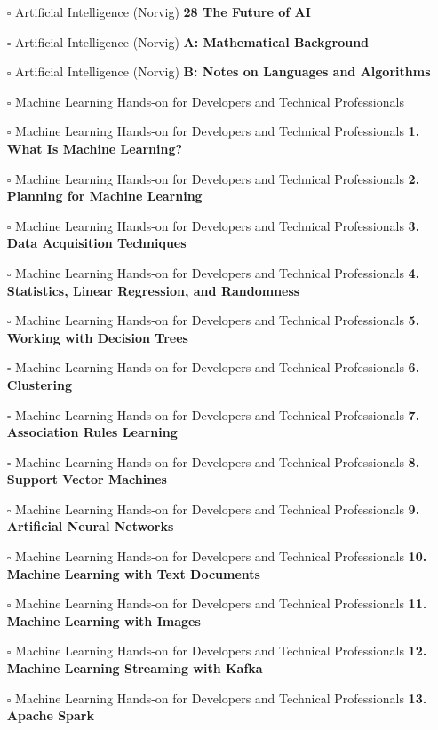 \documentclass[a4, landscape, 12pt]{article}
\newcommand{\checkbox}{$\square$}%
\begin{document}
\begin{itemize}
{}
\item [\checkbox]  Artificial Intelligence (Norvig) \textbf{ 28 The Future of AI
}
\item [\checkbox]  Artificial Intelligence (Norvig) \textbf{ A: Mathematical Background
}
\item [\checkbox]  Artificial Intelligence (Norvig) \textbf{ B: Notes on Languages and Algorithms
}
\item [\checkbox]  Machine Learning Hands-on for Developers and Technical Professionals \textbf{
}
\item [\checkbox]  Machine Learning Hands-on for Developers and Technical Professionals \textbf{ 1. What Is 
Machine Learning?
}
\item [\checkbox]  Machine Learning Hands-on for Developers and Technical Professionals \textbf{ 2. Planning for Machine Learning
}
\item [\checkbox]  Machine Learning Hands-on for Developers and Technical Professionals \textbf{ 3. Data Acquisition Techniques
}
\item [\checkbox]  Machine Learning Hands-on for Developers and Technical Professionals \textbf{ 4. Statistics, Linear Regression, and Randomness
}
\item [\checkbox]  Machine Learning Hands-on for Developers and Technical Professionals \textbf{ 5. Working with Decision Trees
}
\item [\checkbox]  Machine Learning Hands-on for Developers and Technical Professionals \textbf{ 6. Clustering
}
\item [\checkbox]  Machine Learning Hands-on for Developers and Technical Professionals \textbf{ 7. Association Rules Learning
}
\item [\checkbox]  Machine Learning Hands-on for Developers and Technical Professionals \textbf{ 8. Support Vector Machines
}
\item [\checkbox]  Machine Learning Hands-on for Developers and Technical Professionals \textbf{ 9. Artificial Neural Networks
}
\item [\checkbox]  Machine Learning Hands-on for Developers and Technical Professionals \textbf{ 10. Machine Learning with Text Documents
}
\item [\checkbox]  Machine Learning Hands-on for Developers and Technical Professionals \textbf{ 11. Machine Learning with Images
}
\item [\checkbox]  Machine Learning Hands-on for Developers and Technical Professionals \textbf{ 12. Machine Learning Streaming with Kafka
}
\item [\checkbox]  Machine Learning Hands-on for Developers and Technical Professionals \textbf{ 13. Apache Spark
}
\end{itemize}
\end{document}
